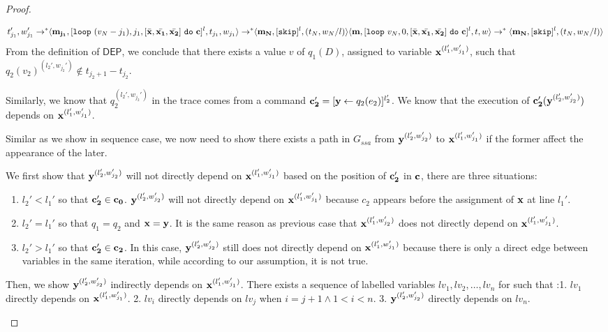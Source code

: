 \documentclass[a4paper,11pt]{article}
\begin{document}
\begin{proof}
\begin{itemize}
\begin{enumerate}
\begin{enumerate}
\[{{{  t_{j_1}',w_{j_1}'}  \rightarrow^{*}}
  \\
  {\langle \mathbf{{m_{j_1}}}, [\mathtt{loop} ~ (v_N - j_1), j_1, [\bar{\mathbf{{x}}}, \bar{\mathbf{{x_1}}}, \bar{\mathbf{{x_2}}}] ~ \mathtt{do} ~ \mathbf{{c}}]^{l},
  t_{j_1}, w_{j_1} \rangle \rightarrow^{*} }
  \\
  {
\langle \mathbf{{m_N}}, [\mathtt{skip}]^{l}, (t_N,w_N/l) \rangle
}}
  {\langle \mathbf{{m}}, [\mathtt{loop} ~ v_N, 0, [\bar{\mathbf{{x}}}, \bar{\mathbf{{x_1}}}, \bar{\mathbf{{x_2}}}] ~ \mathtt{do} ~ \mathbf{{c}}]^{l},  t,w \rangle \rightarrow^{*} \langle \mathbf{{m_N}}, [\mathtt{skip}]^{l}, (t_N,w_N/l) \rangle }
 \]
 From the definition of $\mathsf{DEP}$, we conclude that there exists a value $v$ of $q_1(D)$, assigned to variable $\mathbf{{x}}^{(l_1',w_{j_1}')}$, such that $ q_2(v_2)^{(l_2',w_{j_2}')} \not\in t_{j_2+1}-t_{j_2}$. 
 
 Similarly, we know that $q_2^{(l_2',w_{j_2}')}$ in the trace comes from a command $\mathbf{{c_2'}} = [\mathrel{ \mathbf{{y}} \leftarrow q_2(e_2) }]^{l_2'}$. We know that the execution of $\mathbf{{c_2'}}(\mathbf{{y}}^{(l_2', w_{j_2}')})$ depends on $\mathbf{{x}}^{(l_1',w_{j_1}')}$. 
   
 Similar as we show in sequence case, we now need to show there exists a path in $G_{ssa}$ from  $\mathbf{{y}}^{(l_2', w_{j_2}')} $ to $\mathbf{{x}}^{(l_1',w_{j_1}')} $ if the former affect the appearance of the later. 
 
   
 We first show that $\mathbf{{y}}^{(l_2', w_{j_2}')}$ will not directly depend on $\mathbf{{x}}^{(l_1',w_{j_1}')}$  based on the position of $\mathbf{{c_2'}}$ in $\mathbf{{c}}$, there are three situations:
 \begin{enumerate}
     \item $l_2' < l_1'$ so that $\mathbf{{c_2'}} \in \mathbf{{c_0}}$. $\mathbf{{y}}^{(l_2', w_{j_2}')}$ will not directly depend on $\mathbf{{x}}^{(l_1',w_{j_1}')}$ because $c_2$ appears before the assignment of $\mathbf{{x}}$ at line $l_1'$.  
     \item $l_2' = l_1'$ so that $q_1= q_2$ and $\mathbf{{x}}=\mathbf{{y}}$. It is the same reason as previous case that $\mathbf{{x}}^{(l_1',w_{j_2}')}$ does not directly depend on $\mathbf{{x}}^{(l_1',w_{j_1}')}$.
     \item $l_2' > l_1'$ so that $\mathbf{{c_2'}} \in \mathbf{{c_2}}$. In this case, $\mathbf{{y}}^{(l_2',w_{j_2}')}$ still does not directly depend on $\mathbf{{x}}^{(l_1',w_{j_1}')}$ because there is only a direct edge between variables in the same iteration, while according to our assumption, it is not true.
 \end{enumerate}
 
   Then, we show $\mathbf{{y}}^{(l_2', w_{j_2}')}$ indirectly depends on $\mathbf{{x}}^{(l_1', w_{j_1}')}$.  
    There exists a sequence of labelled variables $lv_1,lv_2, \ldots, lv_n $ for such that :1. $lv_1$ directly depends on $\mathbf{{x}}^{(l_{1}',w_{j_1}')}$. 2. $lv_i$ directly depends on $lv_j$ when $i = j+1 \land 1 <i < n $. 3. $\mathbf{{y}}^{(l_2', w_{j_2}')}$ directly depends on $lv_n$. 
    

\end{enumerate}
\end{enumerate}
\end{itemize}
\end{proof}
\end{document}
